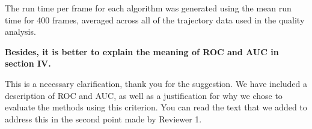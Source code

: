 \documentclass[usenames,dvipsnames]{article}
\newcommand{\todo}[1]{\textcolor{red}{#1}}
\providecommand{\response}[1]{
\noindent
\noindent\colorbox{gray!20}{
\parbox{\textwidth}{
\setlength{\parskip}{.1in}
\setlength{\parindent}{.1in}
#1}
}
}
\begin{document}
\begin{enumerate}
\begin{item}
\response{The run time per frame for each algorithm was generated using the mean run time for 400 frames, averaged across all of the trajectory data used in the quality analysis.}
\end{item}

\begin{item}
\textbf{
Besides, it is better to explain the meaning of ROC and AUC in section IV.}

This is a necessary clarification, thank you for the suggestion. We have included a description of ROC and AUC, as well as a justification for why we chose to evaluate the methods using this criterion. You can read the text that we added to address this in the second point made by Reviewer 1.

\end{item}
\end{enumerate}





\end{document}
